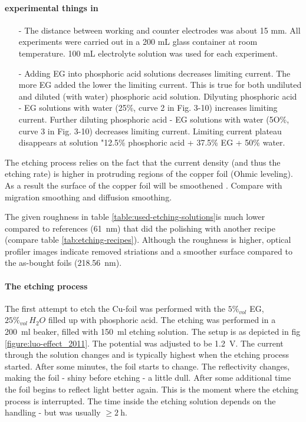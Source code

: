 \paragraph{experimental things in \cite{jinshan_electrochemical_2004}}
\begin{itemize}
	\item[-]The distance between working and counter electrodes was about 15 mm. All experiments were carried out in a 200 mL glass container at room temperature. 100 mL electrolyte solution was used for each experiment.
	\item[-]Adding EG into phosphoric acid solutions decreases limiting current. The more EG added the lower the limiting current. This is true for both undiluted and diluted (with water) phosphoric acid solution. Dilyuting phosphoric acid - EG solutions with water (25\%, curve 2 in Fig. 3-10) increases limiting current. Further diluting phosphoric acid - EG solutions with water (5O\%, curve 3 in Fig. 3-10) decreases limiting current. Limiting current plateau disappears at solution "12.5\% phosphoric acid + 37.5\% EG + 50\% water.
\end{itemize}
The etching process relies on the fact that the current density (and thus the etching rate) is higher in protruding regions of the copper foil (Ohmic leveling).  As a result the surface of the copper foil will be smoothened \cite{luo_effect_2011}. Compare with migration smoothing and diffusion smoothing\cite{jinshan_electrochemical_2004}.

The given roughness in table \ref{table:used-etching-solutions}is much lower compared to references (\SI{61}{\nm})\cite[2]{bin_zhang_low-temperature_2012} that did the polishing with another recipe (compare table \ref{tab:etching-recipes}). Although the roughness is higher, optical profiler images indicate removed striations and a smoother surface compared to the as-bought foils (\SI{218,56}{\nm})\cite[2]{bin_zhang_low-temperature_2012}.

\paragraph{The etching process}
The first attempt to etch the Cu-foil was performed with the $5\%_{vol}$ EG, $25\%_{vol}\,H_2O$ filled up with phosphoric acid. The etching was performed in a \SI{200}{\ml} beaker, filled with \SI{150}{\ml} etching solution. The setup is as depicted in fig \ref{figure:luo-effect_2011}. The potential was adjusted to be \SI{1.2}{\V}. The current through the solution changes and is typically highest when the etching process started. After some minutes, the foil starts to change. The reflectivity changes, making the foil - shiny before etching - a little dull. After some additional time the foil begins to reflect light better again. This is the moment where the etching process is interrupted. The time inside the etching solution depends on the handling - but was usually $\geq \SI{2}{\hour}$. 

